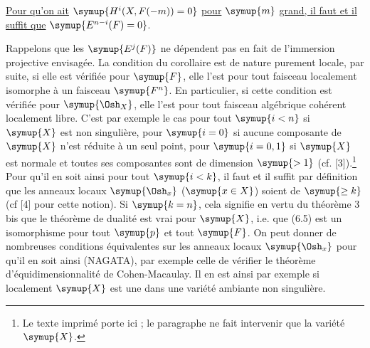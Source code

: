  \uline{Pour qu'on ait} $\symup{H^{i}(X,F(-m))=0}$ \uline{pour} $\symup{m}$ \uline{grand, il
faut et il suffit que} $\symup{E^{n-i}(F)=0}$.

Rappelons que les $\symup{E^{j}(F)}$ ne dépendent pas en fait de l'immersion projective
envisagée. La condition du corollaire est de nature purement locale, par suite,
si elle est vérifiée pour $\symup{F}$, elle l'est pour tout faisceau localement
isomorphe à un faisceau $\symup{F^{n}}$. En particulier, si cette condition est vérifiée
pour $\symup{\Osh_X}$, elle l'est pour tout faisceau algébrique cohérent localement
libre. C'est par exemple le cas pour tout $\symup{i<n}$ si $\symup{X}$ est non singulière, pour
$\symup{i=0}$ si aucune composante de $\symup{X}$ n'est réduite à un seul point, pour $\symup{i=0,1}$
si $\symup{X}$ est normale et toutes ses composantes sont de dimension $\symup{>1}$ (cf.
[3]).\footnote{Le texte imprimé porte ici  ; le paragraphe
ne fait intervenir que la variété $\symup{X}$.} Pour qu'il en soit ainsi pour tout
$\symup{i<k}$, il faut et il suffit par définition que les anneaux locaux
$\symup{\Osh_x}$ ($\symup{x\in X}$) soient de  $\symup{\geq k}$ (cf [4]
pour cette notion). Si $\symup{k=n}$, cela signifie en vertu du théorème 3 bis que le
théorème de dualité est vrai pour $\symup{X}$, i.e. que (6.5) est un isomorphisme pour
tout $\symup{p}$ et tout $\symup{F}$. On peut donner de nombreuses conditions équivalentes sur
les anneaux locaux $\symup{\Osh_x}$ pour qu'il en soit ainsi (NAGATA), par exemple celle
de vérifier le théorème d'équidimensionnalité de Cohen-Macaulay. Il en est ainsi
par exemple si localement $\symup{X}$ est une  dans une
variété ambiante non singulière.


